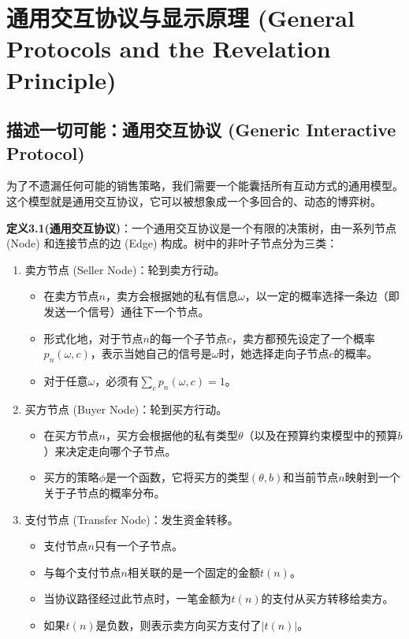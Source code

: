 \section{通用交互协议与显示原理 (General Protocols and the Revelation Principle)}

\subsection{描述一切可能：通用交互协议 (Generic Interactive Protocol)}

为了不遗漏任何可能的销售策略，我们需要一个能囊括所有互动方式的通用模型。这个模型就是通用交互协议，它可以被想象成一个多回合的、动态的博弈树。

\textbf{定义3.1(通用交互协议)}：一个通用交互协议是一个有限的决策树，由一系列节点 (Node) 和连接节点的边 (Edge) 构成。树中的非叶子节点分为三类：
\begin{enumerate}
    \item 卖方节点 (Seller Node)：轮到卖方行动。
       \begin{itemize}
         \item 在卖方节点$n$，卖方会根据她的私有信息$\omega$，以一定的概率选择一条边（即发送一个信号）通往下一个节点。
         \item 形式化地，对于节点$n$的每一个子节点$c$，卖方都预先设定了一个概率$p_n(\omega, c)$，表示当她自己的信号是$\omega$时，她选择走向子节点$c$的概率。
         \item 对于任意$\omega$，必须有$\sum\limits_{c}p_n(\omega,c)=1$。
       \end{itemize}
    \item 买方节点 (Buyer Node)：轮到买方行动。
       \begin{itemize}
         \item 在买方节点$n$，买方会根据他的私有类型$\theta$（以及在预算约束模型中的预算$b$）来决定走向哪个子节点。
         \item 买方的策略$\phi$是一个函数，它将买方的类型$(\theta,b)$和当前节点$n$映射到一个关于子节点的概率分布。
       \end{itemize}
    \item 支付节点 (Transfer Node)：发生资金转移。
       \begin{itemize}
         \item 支付节点$n$只有一个子节点。
         \item 与每个支付节点$n$相关联的是一个固定的金额$t(n)$。
         \item 当协议路径经过此节点时，一笔金额为$t(n)$的支付从买方转移给卖方。
         \item 如果$t(n)$是负数，则表示卖方向买方支付了$|t(n)|$。
       \end{itemize}
\end{enumerate}

